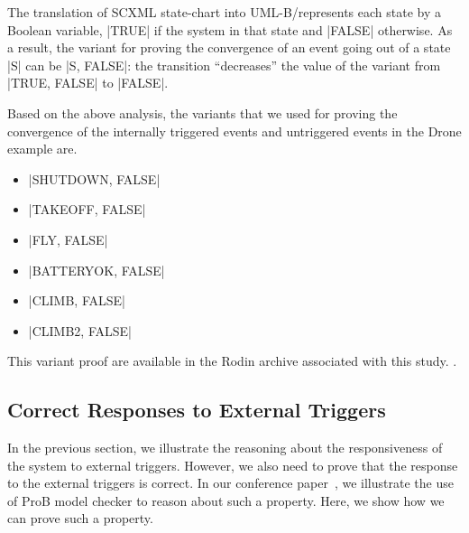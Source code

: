 The translation of SCXML state-chart into UML-B/\EventB represents each
state by a Boolean variable, |TRUE| if the system in that state and
|FALSE| otherwise. As a result, the variant for proving the convergence
of an event going out of a state |S| can be |{S, FALSE}|: the
transition ``decreases'' the value of the variant from |{TRUE, FALSE}|
to |FALSE|.

Based on the above analysis, the variants that we used for proving the
convergence of the internally triggered events and untriggered events
in the Drone example are.
\begin{itemize}
\item |{SHUTDOWN, FALSE}|

\item |{TAKEOFF, FALSE}|

\item |{FLY, FALSE}|

\item |{BATTERYOK, FALSE}|

\item |{CLIMB, FALSE}|

\item |{CLIMB2, FALSE}|
\end{itemize}

This variant proof are available in the Rodin archive associated with this study.
.


\subsection{Correct Responses to External Triggers}
\label{sec:corr-resp-extern}
In the previous section, we illustrate the reasoning about the
responsiveness of the system to external triggers.  However, we also
need to prove that the response to the external triggers is correct.
In our conference paper~\cite{detect2020}, we illustrate the use of
ProB model checker to reason about such a property.  Here, we show how
we can prove such a property.


